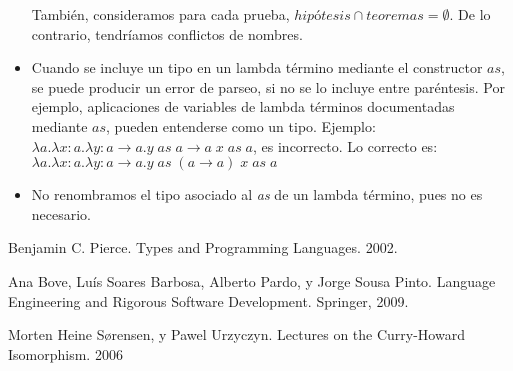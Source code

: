 \documentclass[a4paper,11pt]{article}
\theoremstyle{definition}
\begin{document}
\begin{itemize}
  También, consideramos para cada prueba, $hipótesis \cap teoremas = \emptyset$. De lo contrario, tendríamos conflictos de nombres.
  
  \item Cuando se incluye un tipo en un lambda término mediante el constructor $as$, se puede producir un error de parseo, si no se lo
  incluye entre paréntesis. Por ejemplo, aplicaciones de variables de lambda términos documentadas mediante $as$, pueden entenderse
  como un tipo. Ejemplo: $\lambda a.\lambda x:a. \lambda y:a \rightarrow a. y \; as \; a \rightarrow a \; x \; as \; a$,
  es incorrecto. Lo correcto es: $\lambda a.\lambda x:a. \lambda y:a \rightarrow a. y \; as \; (a \rightarrow a) \; x \; as \; a$
  
  \item No renombramos el tipo asociado al \textit{as} de un lambda término, pues no es necesario.
  

\end{itemize}


\begin{thebibliography}{9}
  Benjamin C. Pierce. 
  Types and Programming Languages. 2002.

  Ana Bove, Luís Soares Barbosa,
  Alberto Pardo, y
  Jorge Sousa Pinto.
  Language Engineering and Rigorous Software Development.
  Springer, 2009.

  Morten Heine Sørensen, y Pawel Urzyczyn.
  Lectures on the Curry-Howard Isomorphism.
  2006

\end{thebibliography}
\end{document}
